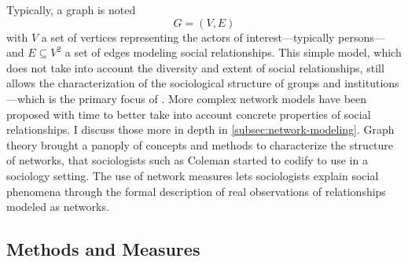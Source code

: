 Typically, a graph is noted
\begin{equation}
    G = (V, E)\label{eq:graph}
\end{equation}
with $V$ a set of vertices representing the actors of interest---typically persons---and $E \subseteq V^2$ a set of edges modeling social relationships.
This simple model, which does not take into account the diversity and extent of social relationships, still allows the characterization of the sociological structure of groups and institutions---which is the primary focus of \sna\cite{scottSocialNetworkAnalysis1988, freemanDevelopmentSocialNetwork2004}.
More complex network models have been proposed with time to better take into account concrete properties of social relationships.
I discuss those more in depth in \autoref{subsec:network-modeling}.
Graph theory brought a panoply of concepts and methods to characterize the structure of  networks, that sociologists such as Coleman started to codify to use in a sociology setting\cite{colemanIntroductionMathematicalSociology1964}.
The use of network measures lets sociologists explain social phenomena through the formal description of real observations of relationships modeled as networks. 


\subsection{Methods and Measures}\label{subsec:methods-and-measures}

